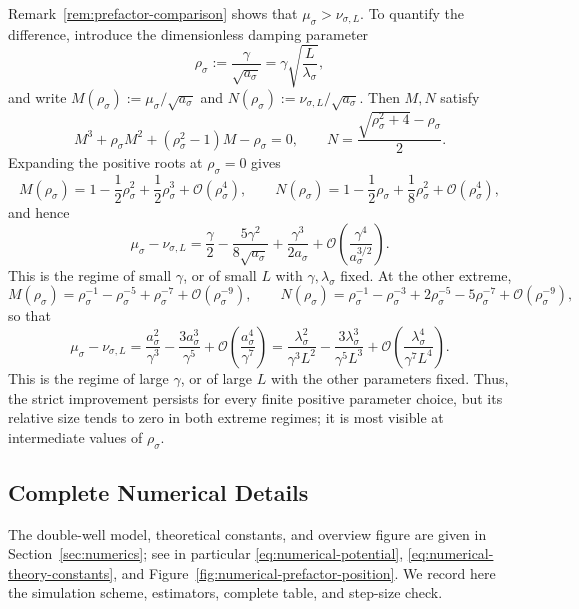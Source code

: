 \documentclass[11pt]{article}
\numberwithin{equation}{section}
\theoremstyle{plain}
\theoremstyle{definition}
\theoremstyle{remark}
\begin{document}
Remark~\ref{rem:prefactor-comparison} shows that
$\mu_{\sigma}>\nu_{\sigma,L}$.  To quantify the difference, introduce the
dimensionless damping parameter
\[
\rho_\sigma:=\frac{\gamma}{\sqrt{a_\sigma}}
    =\gamma\sqrt{\frac{L}{\lambda_\sigma}},
\]
and write $M(\rho_\sigma):=\mu_\sigma/\sqrt{a_\sigma}$ and
$N(\rho_\sigma):=\nu_{\sigma,L}/\sqrt{a_\sigma}$.  Then $M,N$ satisfy
\[
    M^3+\rho_\sigma M^2+(\rho_\sigma^2-1)M-\rho_\sigma=0,
    \qquad
    N=\frac{\sqrt{\rho_\sigma^2+4}-\rho_\sigma}{2}.
\]
Expanding the positive roots at $\rho_\sigma=0$ gives
\[
    M(\rho_\sigma)
    =1-\frac12\rho_\sigma^2+\frac12\rho_\sigma^3
      +\mathcal O(\rho_\sigma^4),
      \qquad
    N(\rho_\sigma)
    =1-\frac12\rho_\sigma+\frac18\rho_\sigma^2
      +\mathcal O(\rho_\sigma^4),
\]
and hence
\begin{equation}\label{eq:small-rho-prefactor-gain}
    \mu_\sigma-\nu_{\sigma,L}
    =\frac{\gamma}{2}
     -\frac{5\gamma^2}{8\sqrt{a_\sigma}}
     +\frac{\gamma^3}{2a_\sigma}
     +\mathcal O\!\left(\frac{\gamma^4}{a_\sigma^{3/2}}\right).
\end{equation}
This is the regime of small $\gamma$, or of small $L$ with
$\gamma,\lambda_\sigma$ fixed.  At the other extreme,
\[
    M(\rho_\sigma)
      =\rho_\sigma^{-1}-\rho_\sigma^{-5}
       +\rho_\sigma^{-7}+\mathcal O(\rho_\sigma^{-9}),
    \qquad
    N(\rho_\sigma)
      =\rho_\sigma^{-1}-\rho_\sigma^{-3}
       +2\rho_\sigma^{-5}-5\rho_\sigma^{-7}
       +\mathcal O(\rho_\sigma^{-9}),
\]
so that
\begin{equation}\label{eq:large-rho-prefactor-gain}
    \mu_\sigma-\nu_{\sigma,L}
    =\frac{a_\sigma^2}{\gamma^3}
     -\frac{3a_\sigma^3}{\gamma^5}
     +\mathcal O\!\left(\frac{a_\sigma^4}{\gamma^7}\right)
    =\frac{\lambda_\sigma^2}{\gamma^3L^2}
     -\frac{3\lambda_\sigma^3}{\gamma^5L^3}
     +\mathcal O\!\left(\frac{\lambda_\sigma^4}{\gamma^7L^4}\right).
\end{equation}
This is the regime of large $\gamma$, or of large $L$ with the other
parameters fixed.  Thus, the strict improvement persists for every finite
positive parameter choice, but its relative size tends to zero in both
extreme regimes; it is most visible at intermediate values of $\rho_\sigma$.

\subsection{Complete Numerical Details}
\label{app:numerical-details}

The double-well model, theoretical constants, and overview figure are given in
Section~\ref{sec:numerics}; see in particular
\eqref{eq:numerical-potential}, \eqref{eq:numerical-theory-constants}, and
Figure~\ref{fig:numerical-prefactor-position}.  We record here the simulation
scheme, estimators, complete table, and step-size check.
\end{document}
